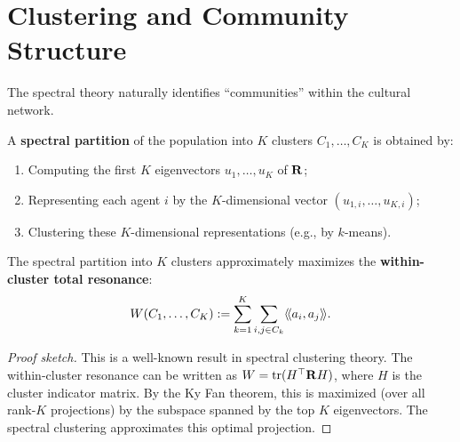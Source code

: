 \section{Clustering and Community Structure}

The spectral theory naturally identifies ``communities'' within the cultural
network.

\begin{definition}
\label{def:clustering}
A \textbf{spectral partition} of the population into $K$ clusters $C_1, \ldots,
C_K$ is obtained by:
\begin{enumerate}
\item Computing the first $K$ eigenvectors $u_1, \ldots, u_K$ of $\mathbf{R}$;
\item Representing each agent $i$ by the $K$-dimensional vector
$(u_{1,i}, \ldots, u_{K,i})$;
\item Clustering these $K$-dimensional representations (e.g., by $k$-means).
\end{enumerate}
\end{definition}

\begin{theorem}
\label{thm:cluster-resonance}
The spectral partition into $K$ clusters approximately maximizes the
\textbf{within-cluster total resonance}:
\[
  W(C_1, \ldots, C_K) := \sum_{k=1}^K \sum_{i, j \in C_k} \langle\!\langle a_i, a_j \rangle\!\rangle.
\]
\end{theorem}

\begin{proof}[Proof sketch]
This is a well-known result in spectral clustering theory. The within-cluster
resonance can be written as $W = \operatorname{tr}(H^\top \mathbf{R} H)$, where $H$
is the cluster indicator matrix. By the Ky Fan theorem, this is maximized (over
all rank-$K$ projections) by the subspace spanned by the top $K$ eigenvectors.
The spectral clustering approximates this optimal projection.
\end{proof}

